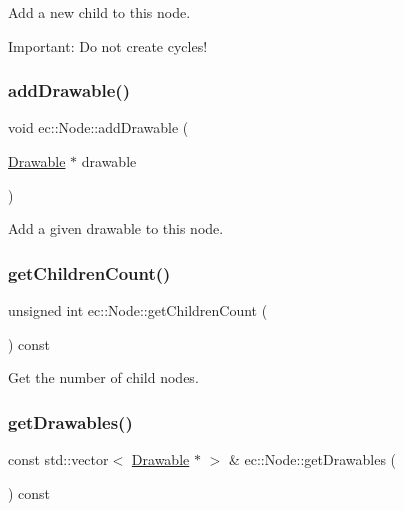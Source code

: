 Add a new child to this node. 

Important\+: Do not create cycles! \mbox{\label{classec_1_1_node_aef615bcf1c24225838e00c15d03dc707}} 
\subsubsection{\texorpdfstring{add\+Drawable()}{addDrawable()}}
{\footnotesize\ttfamily void ec\+::\+Node\+::add\+Drawable (\begin{DoxyParamCaption}\item[{\mbox{\hyperlink{classec_1_1_drawable}{Drawable}} $\ast$}]{drawable }\end{DoxyParamCaption})}



Add a given drawable to this node. 

\mbox{\label{classec_1_1_node_a3fb0342e532d42984870f598ec4d0ba3}} 
\subsubsection{\texorpdfstring{get\+Children\+Count()}{getChildrenCount()}}
{\footnotesize\ttfamily unsigned int ec\+::\+Node\+::get\+Children\+Count (\begin{DoxyParamCaption}{ }\end{DoxyParamCaption}) const}



Get the number of child nodes. 

\mbox{\label{classec_1_1_node_a2403cd39000eceffdec878133f621e3a}} 
\subsubsection{\texorpdfstring{get\+Drawables()}{getDrawables()}}
{\footnotesize\ttfamily const std\+::vector$<$ \mbox{\hyperlink{classec_1_1_drawable}{Drawable}} $\ast$ $>$ \& ec\+::\+Node\+::get\+Drawables (\begin{DoxyParamCaption}{ }\end{DoxyParamCaption}) const\hspace{0.3cm}{\ttfamily [virtual]}}



